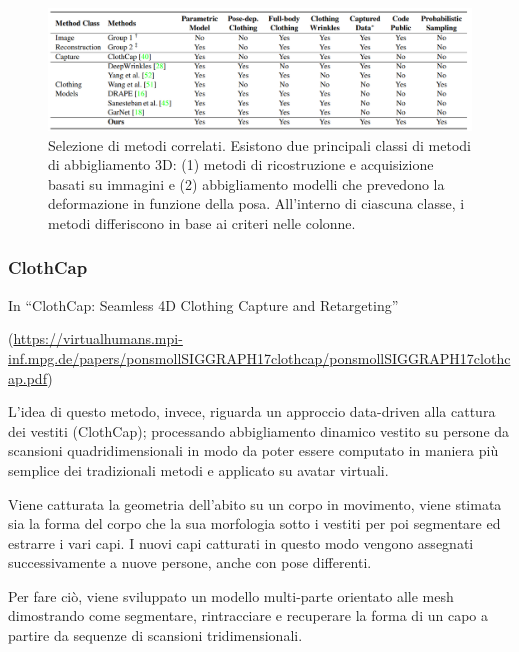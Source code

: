 \begin{figure}[ht!]
  \centering
  \includegraphics[scale=0.4]{Images/IntroductionPic/CAPETabel.png}
  \caption{Selezione di metodi correlati. Esistono due principali classi di metodi di abbigliamento 3D: (1) metodi di ricostruzione e acquisizione basati su immagini e (2) abbigliamento
modelli che prevedono la deformazione in funzione della posa. All'interno di ciascuna classe, i metodi differiscono in base ai criteri nelle colonne.}
  \label{fig:CAPETabel}
\end{figure}

\medskip

\subsubsection{ClothCap}

In “ClothCap: Seamless 4D Clothing Capture and Retargeting” 

(\url{https://virtualhumans.mpi-inf.mpg.de/papers/ponsmollSIGGRAPH17clothcap/ponsmollSIGGRAPH17clothcap.pdf})

\medskip

L’idea di questo metodo, invece, riguarda un approccio data-driven alla cattura dei vestiti (ClothCap); processando abbigliamento dinamico vestito su persone da scansioni quadridimensionali in modo da poter essere computato in maniera più semplice dei tradizionali metodi e applicato su avatar virtuali.

\medskip

Viene catturata la geometria dell’abito su un corpo in movimento, viene stimata sia la forma del corpo che la sua morfologia sotto i vestiti per poi segmentare ed estrarre i vari capi.
I nuovi capi catturati in questo modo vengono assegnati successivamente a nuove persone, anche con pose differenti.

\medskip

Per fare ciò, viene sviluppato un modello multi-parte orientato alle mesh dimostrando come segmentare, rintracciare e recuperare la forma di un capo a partire da sequenze di scansioni tridimensionali.

